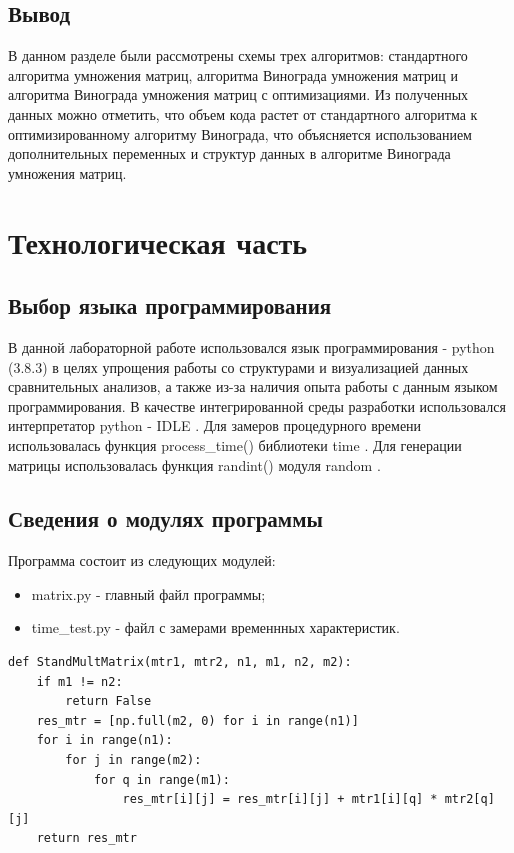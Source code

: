 \documentclass[12pt]{report}
\begin{document}
\section{Вывод}
В данном разделе были рассмотрены схемы трех алгоритмов: стандартного алгоритма умножения матриц, алгоритма Винограда умножения матриц и алгоритма Винограда умножения матриц с оптимизациями. Из полученных данных можно отметить, что объем кода растет от стандартного алгоритма к оптимизированному алгоритму Винограда, что объясняется использованием дополнительных переменных и структур данных в алгоритме Винограда умножения матриц.

\chapter{Технологическая часть}
\section{Выбор языка программирования}
В данной лабораторной работе использовался язык программирования - python (3.8.3) \cite{bib1} в целях упрощения работы со структурами и визуализацией данных сравнительных анализов, а также из-за наличия опыта работы с данным языком программирования. В качестве интегрированной среды разработки использовался интерпретатор python - IDLE  \cite{bib2}. Для замеров процедурного времени использовалась функция process\_time() библиотеки time \cite{bib3}.  Для генерации матрицы использовалась функция randint() модуля random \cite{bib4}.

\section{Сведения о модулях программы}
Программа состоит из следующих модулей:
\begin{itemize}
	\item matrix.py - главный файл программы;
	\item time\_test.py - файл с замерами временнных характеристик.
\end{itemize}

\begin{lstlisting}[label=some-code,caption=Подпрограмма стандартного умножения матриц]
def StandMultMatrix(mtr1, mtr2, n1, m1, n2, m2):
    if m1 != n2:
        return False
    res_mtr = [np.full(m2, 0) for i in range(n1)]
    for i in range(n1):
        for j in range(m2):
            for q in range(m1):
                res_mtr[i][j] = res_mtr[i][j] + mtr1[i][q] * mtr2[q][j]
    return res_mtr

\end{lstlisting}
\end{document}
